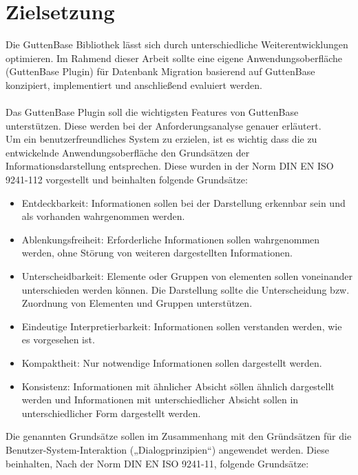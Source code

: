 \section{Zielsetzung}
Die GuttenBase Bibliothek lässt sich durch unterschiedliche Weiterentwicklungen optimieren. 
Im Rahmend dieser Arbeit sollte  eine eigene Anwendungsoberfläche (GuttenBase Plugin) für Datenbank Migration basierend auf GuttenBase konzipiert, implementiert und anschließend evaluiert werden. \\ \\
Das GuttenBase Plugin soll die wichtigsten Features von GuttenBase unterstützen. Diese werden bei der Anforderungsanalyse genauer erläutert.\\
Um ein benutzerfreundliches System zu erzielen, ist es wichtig dass die zu entwickelnde Anwendungsoberfläche den Grundsätzen der Informationsdarstellung entsprechen. Diese wurden in der Norm DIN EN ISO 9241-112 vorgestellt und beinhalten folgende Grundsätze:
\begin{itemize}
	\item Entdeckbarkeit: 
	Informationen sollen bei der Darstellung erkennbar sein und als vorhanden wahrgenommen werden.
	
	\item Ablenkungsfreiheit: 
	Erforderliche Informationen sollen wahrgenommen werden, ohne Störung von weiteren dargestellten Informationen.
	
	\item Unterscheidbarkeit: 
	Elemente oder Gruppen von elementen sollen voneinander unterschieden werden können. Die Darstellung sollte die Unterscheidung bzw. Zuordnung von Elementen und Gruppen unterstützen.
	
	\item Eindeutige Interpretierbarkeit:
	Informationen sollen verstanden werden, wie es vorgesehen ist.
	
	\item Kompaktheit:
	Nur notwendige Informationen sollen dargestellt werden.
	
	\item Konsistenz:
	Informationen mit ähnlicher Absicht söllen ähnlich dargestellt werden und Informationen mit unterschiedlicher Absicht sollen in unterschiedlicher Form dargestellt werden.
	
\end{itemize}
Die genannten Grundsätze sollen im Zusammenhang mit den Gründsätzen für die Benutzer-System-Interaktion („Dialogprinzipien“) angewendet werden. Diese beinhalten, Nach der Norm DIN EN ISO 9241-11, folgende Grundsätze:
